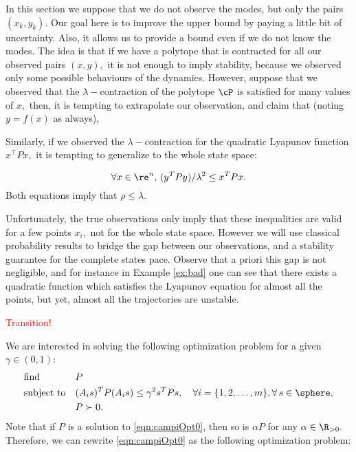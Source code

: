 In this section we suppose that we do not observe the modes, but only the pairs $(x_k,y_k).$
Our goal here is to improve the upper bound by paying a little bit of uncertainty. Also, it allows us to provide a bound even if we do not know the modes. The idea is that if we have a polytope that is contracted for all our observed pairs $(x,y),$  it is not enough to imply stability, because we observed only some possible behaviours of the dynamics.  However, suppose that we observed that the $\lambda-$contraction of the polytope $\cP$ is satisfied for many values of $x,$ then, it is tempting to extrapolate our observation, and claim that (noting $y=f(x) $ as always),

Similarly, if we observed the $\lambda-$contraction for the quadratic Lyapunov function $x^\top P x,$ it is tempting to generalize to the whole state space:

\begin{equation}\label{eq:cqlf}
\forall{x} \in \re^n,\,  (y^T P y)/\lambda^2 \leq x^TPx.
\end{equation}
Both equations imply that $\rho\leq \lambda.$

Unfortunately, the true observations only imply that these inequalities are valid for a few points $x_i,$ not for the whole state space. However we will use classical probability results to bridge the gap between our observations, and a stability guarantee for the complete states pace. Observe that a priori this gap is not negligible, and for instance in Example \ref{ex:bad} one can see that there exists a quadratic function which satisfies the Lyapunov equation for almost all the points, but yet, almost all the trajectories are unstable.
%

\textcolor{red}{Transition!}


We are interested in solving the following optimization problem for a given $\gamma \in (0,1)$:
\begin{equation}
\label{eqn:campiOpt0}
\begin{aligned}
& \text{find} & & P \\
& \text{subject to} 
&  & (A_is)^TP(A_is) \leq \gamma^2 s^TPs, \quad \forall i = \{1,2, \ldots, m\},  \forall\, s \in \sphere,\\
& && P \succ 0. \\
\end{aligned}
\end{equation}
Note that if $P$ is a solution to \eqref{eqn:campiOpt0}, then so is $\alpha P$ for any $\alpha \in \R_{> 0}.$Therefore, we can rewrite \eqref{eqn:campiOpt0} as the following optimization problem:

